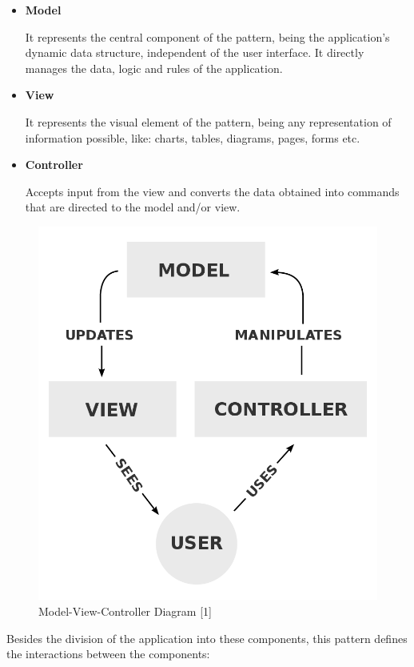\documentclass[12pt,a4paper,twoside]{report}
\begin{document}
\begin{itemize}
\item \textbf{Model}
		
It represents the central component of the pattern, being the application's dynamic data structure, independent of the user interface. It directly manages the data, logic and rules of the application.

\item \textbf{View}

It represents the visual element of the pattern, being any representation of information possible, like: charts, tables, diagrams, pages, forms etc. 

\item \textbf{Controller}

Accepts input from the view and converts the data obtained into commands that are directed to the model and/or view.
\end{itemize}

\begin{figure}
	\centering
	\includegraphics[scale=0.2]{img/diags/MVCDiag.png}
	\caption{Model-View-Controller Diagram [1]}
\end{figure}

Besides the division of the application into these components, this pattern defines the interactions between the components:
\end{document}
